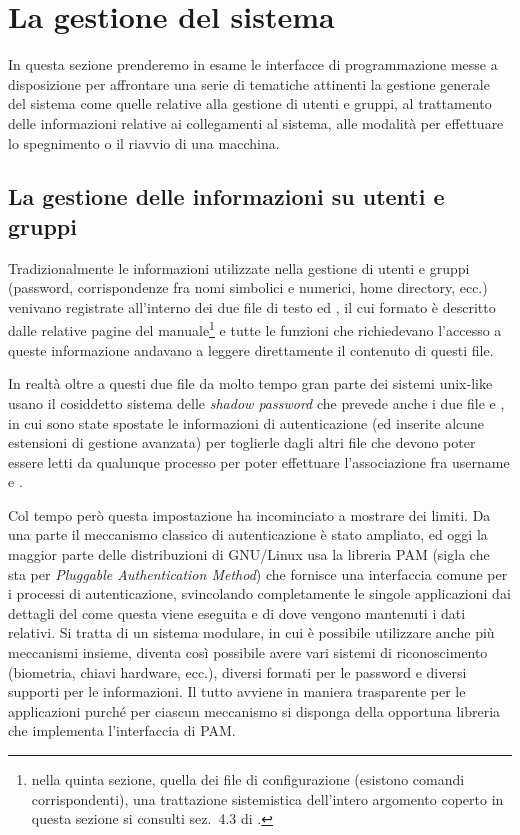 


\section{La gestione del sistema}
\label{sec:sys_management}

In questa sezione prenderemo in esame le interfacce di programmazione messe a
disposizione per affrontare una serie di tematiche attinenti la gestione
generale del sistema come quelle relative alla gestione di utenti e gruppi, al
trattamento delle informazioni relative ai collegamenti al sistema, alle
modalità per effettuare lo spegnimento o il riavvio di una macchina.


\subsection{La gestione delle informazioni su utenti e gruppi}
\label{sec:sys_user_group}

Tradizionalmente le informazioni utilizzate nella gestione di utenti e gruppi
(password, corrispondenze fra nomi simbolici e  numerici, home
directory, ecc.)  venivano registrate all'interno dei due file di testo
 ed , il cui formato è descritto
dalle relative pagine del manuale\footnote{nella quinta sezione, quella dei
  file di configurazione (esistono comandi corrispondenti), una trattazione
  sistemistica dell'intero argomento coperto in questa sezione si consulti
  sez.~4.3 di \cite{AGL}.} e tutte le funzioni che richiedevano l'accesso a
queste informazione andavano a leggere direttamente il contenuto di questi
file.

In realtà oltre a questi due file da molto tempo gran parte dei sistemi
unix-like usano il cosiddetto sistema delle \textit{shadow password} che
prevede anche i due file  e , in
cui sono state spostate le informazioni di autenticazione (ed inserite alcune
estensioni di gestione avanzata) per toglierle dagli altri file che devono
poter essere letti da qualunque processo per poter effettuare l'associazione
fra username e .

Col tempo però questa impostazione ha incominciato a mostrare dei limiti. Da
una parte il meccanismo classico di autenticazione è stato ampliato, ed oggi
la maggior parte delle distribuzioni di GNU/Linux usa la libreria PAM (sigla
che sta per \textit{Pluggable Authentication Method}) che fornisce una
interfaccia comune per i processi di autenticazione, svincolando completamente
le singole applicazioni dai dettagli del come questa viene eseguita e di dove
vengono mantenuti i dati relativi. Si tratta di un sistema modulare, in cui è
possibile utilizzare anche più meccanismi insieme, diventa così possibile
avere vari sistemi di riconoscimento (biometria, chiavi hardware, ecc.),
diversi formati per le password e diversi supporti per le informazioni. Il
tutto avviene in maniera trasparente per le applicazioni purché per ciascun
meccanismo si disponga della opportuna libreria che implementa l'interfaccia
di PAM.

